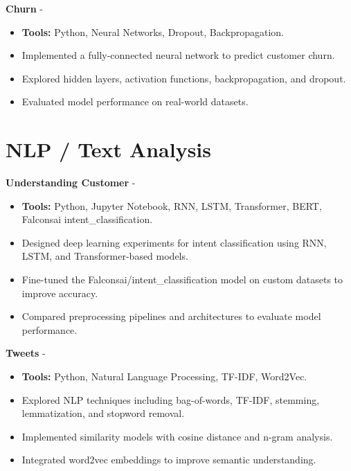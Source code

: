 \documentclass[a4paper,11pt]{article}%
\begin{document}
%
\noindent \textbf{Churn} - \href{https://github.com/sboof911/churn}{{}}%
\begin{itemize}[leftmargin=2em,parsep=0pt,topsep=1em]%
\item[] \textbf{Tools:} Python, Neural Networks, Dropout, Backpropagation.%
\item Implemented a fully-connected neural network to predict customer churn.%
\item Explored hidden layers, activation functions, backpropagation, and dropout.%
\item Evaluated model performance on real-world datasets.%
\end{itemize}%
%
\section*{NLP / Text Analysis}%
%
\noindent \textbf{Understanding Customer} - \href{https://github.com/sboof911/Understanding-customer}{{}}%
\begin{itemize}[leftmargin=2em,parsep=0pt,topsep=1em]%
\item[] \textbf{Tools:} Python, Jupyter Notebook, RNN, LSTM, Transformer, BERT, Falconsai intent\_classification.%
\item Designed deep learning experiments for intent classification using RNN, LSTM, and Transformer-based models.%
\item Fine-tuned the Falconsai/intent\_classification model on custom datasets to improve accuracy.%
\item Compared preprocessing pipelines and architectures to evaluate model performance.%
\end{itemize}%
%
\noindent \textbf{Tweets} - \href{https://github.com/sboof911/tweets}{{}}%
\begin{itemize}[leftmargin=2em,parsep=0pt,topsep=1em]%
\item[] \textbf{Tools:} Python, Natural Language Processing, TF-IDF, Word2Vec.%
\item Explored NLP techniques including bag-of-words, TF-IDF, stemming, lemmatization, and stopword removal.%
\item Implemented similarity models with cosine distance and n-gram analysis.%
\item Integrated word2vec embeddings to improve semantic understanding.%
\end{itemize}%
%
\end{document}
